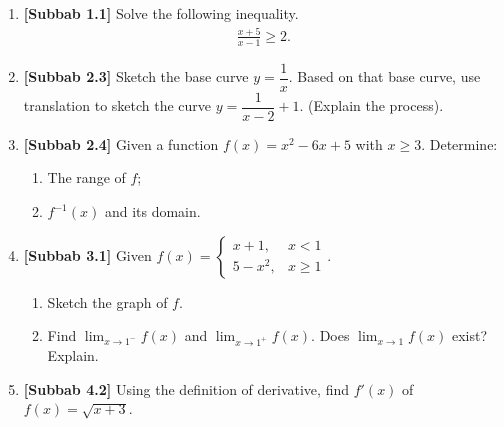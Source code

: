 \documentclass[10pt,openany,a4paper]{article}
\theoremstyle{definition}
\theoremstyle{definition}
\theoremstyle{plain}
\begin{document}
\begin{enumerate}
    \item \textbf{[Subbab 1.1]} Solve the following inequality.
    \begin{align*}
        \frac{x+5}{x-1}\geq 2.
    \end{align*}

    \item \textbf{[Subbab 2.3]} Sketch the base curve $y=\dfrac{1}{x}$. Based on that base curve, use translation to sketch the curve $y=\dfrac{1}{x-2}+1$. (Explain the process).

    \item \textbf{[Subbab 2.4]} Given a function $f(x)=x^2-6x+5$ with $x\geq 3$. Determine:
    \begin{enumerate}
        \item[a)] The range of $f$;
        \item[b)] $f^{-1}(x)$ and its domain.
    \end{enumerate}

    \item \textbf{[Subbab 3.1]} Given $f(x)=\begin{cases}
        x+1, & x<1\\
        5-x^2, & x\geq 1
    \end{cases}$.
    \begin{enumerate}
        \item[a.] Sketch the graph of $f$.
        \item[b.] Find $\displaystyle\lim_{x\to 1^-}f(x)$ and $\displaystyle\lim_{x\to 1^+}f(x)$. Does $\displaystyle\lim_{x\to 1}f(x)$ exist? Explain.
    \end{enumerate}

    \item \textbf{[Subbab 4.2]} Using the definition of derivative, find $f'(x)$ of $f(x)=\sqrt{x+3}$.
\end{enumerate}

\newpage
\end{document}
